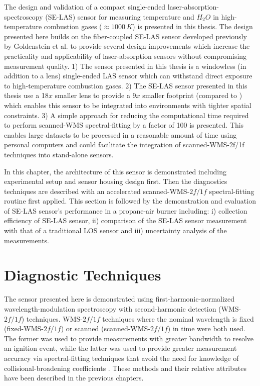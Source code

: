 The design and validation of a compact single-ended laser-absorption-spectroscopy (SE-LAS) sensor for measuring temperature and $H_2O$ in high-temperature combustion gases ($\approx 1000\,K$) is presented in this thesis. The design presented here builds on the fiber-coupled SE-LAS sensor developed previously by Goldenstein et al. \cite{Goldenstein:16} to provide several design improvements which increase the practicality and applicability of laser-absorption sensors without compromising measurement quality. 1) The sensor presented in this thesis is a windowless (in addition to a lens) single-ended LAS sensor which can withstand direct exposure to high-temperature combustion gases. 2) The SE-LAS sensor presented in this thesis use a 18$x$ smaller lens to provide a 9$x$ smaller footprint (compared to \cite{Goldenstein:16}) which enables this sensor to be integrated into environments with tighter spatial constraints. 3) A simple approach for reducing the computational time required to perform scanned-WMS spectral-fitting by a factor of 100 is presented. This enables large datasets to be processed in a reasonable amount of time using personal computers and could facilitate the integration of scanned-WMS-2f/1f techniques into stand-alone sensors.

In this chapter, the architecture of this sensor is demonstrated including experimental setup and sensor housing design first. Then the diagnostics techniques are described with an accelerated scanned-WMS-$2f/1f$ spectral-fitting routine first applied. This section is followed by the demonstration and evaluation of SE-LAS sensor's performance in a propane-air burner including: i) collection efficiency of SE-LAS sensor, ii) comparison of the SE-LAS sensor measurement with that of a traditional LOS sensor and iii) uncertainty analysis of the measurements.

\section{Diagnostic Techniques}
The sensor presented here is demonstrated using first-harmonic-normalized wavelength-modulation spectroscopy with second-harmonic detection (WMS-$2f/1f$) techniques. WMS-$2f/1f$ techniques where the nominal wavelength is fixed (fixed-WMS-$2f/1f$) or scanned (scanned-WMS-$2f/1f$) in time were both used. The former was used to provide measurements with greater bandwidth to resolve an ignition event, while the latter was used to provide greater measurement accuracy via spectral-fitting techniques that avoid the need for knowledge of collisional-broadening coefficients \cite{Goldenstein2014}. These methods and their relative attributes have been described in the previous chapters.

